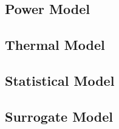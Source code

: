 \subsection{Power Model} 


\subsection{Thermal Model} 


\subsection{Statistical Model} 


\subsection{Surrogate Model} 

